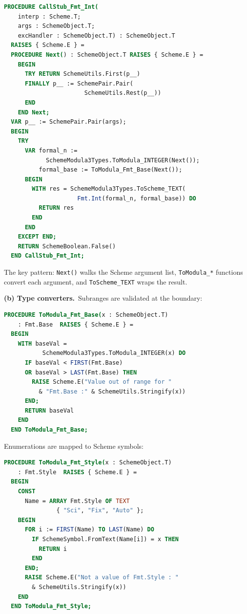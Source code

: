 \documentclass[12pt]{report}
\begin{document}
\begin{lstlisting}[language=Modula3]
PROCEDURE CallStub_Fmt_Int(
    interp : Scheme.T;
    args : SchemeObject.T;
    excHandler : SchemeObject.T) : SchemeObject.T
  RAISES { Scheme.E } =
  PROCEDURE Next() : SchemeObject.T RAISES { Scheme.E } =
    BEGIN
      TRY RETURN SchemeUtils.First(p__)
      FINALLY p__ := SchemePair.Pair(
                       SchemeUtils.Rest(p__))
      END
    END Next;
  VAR p__ := SchemePair.Pair(args);
  BEGIN
    TRY
      VAR formal_n :=
            SchemeModula3Types.ToModula_INTEGER(Next());
          formal_base := ToModula_Fmt_Base(Next());
      BEGIN
        WITH res = SchemeModula3Types.ToScheme_TEXT(
                     Fmt.Int(formal_n, formal_base)) DO
          RETURN res
        END
      END
    EXCEPT END;
    RETURN SchemeBoolean.False()
  END CallStub_Fmt_Int;
\end{lstlisting}

\noindent The key pattern: {\tt Next()} walks the Scheme argument
list, {\tt ToModula\_*} functions convert each argument, and
{\tt ToScheme\_TEXT} wraps the result.

\medskip\noindent\textbf{(b) Type converters.}\  Subranges are validated at the
boundary:

\begin{lstlisting}[language=Modula3]
PROCEDURE ToModula_Fmt_Base(x : SchemeObject.T)
    : Fmt.Base  RAISES { Scheme.E } =
  BEGIN
    WITH baseVal =
           SchemeModula3Types.ToModula_INTEGER(x) DO
      IF baseVal < FIRST(Fmt.Base)
      OR baseVal > LAST(Fmt.Base) THEN
        RAISE Scheme.E("Value out of range for "
          & "Fmt.Base :" & SchemeUtils.Stringify(x))
      END;
      RETURN baseVal
    END
  END ToModula_Fmt_Base;
\end{lstlisting}

\noindent Enumerations are mapped to Scheme symbols:

\begin{lstlisting}[language=Modula3]
PROCEDURE ToModula_Fmt_Style(x : SchemeObject.T)
    : Fmt.Style  RAISES { Scheme.E } =
  BEGIN
    CONST
      Name = ARRAY Fmt.Style OF TEXT
               { "Sci", "Fix", "Auto" };
    BEGIN
      FOR i := FIRST(Name) TO LAST(Name) DO
        IF SchemeSymbol.FromText(Name[i]) = x THEN
          RETURN i
        END
      END;
      RAISE Scheme.E("Not a value of Fmt.Style : "
        & SchemeUtils.Stringify(x))
    END
  END ToModula_Fmt_Style;
\end{lstlisting}
\end{document}
